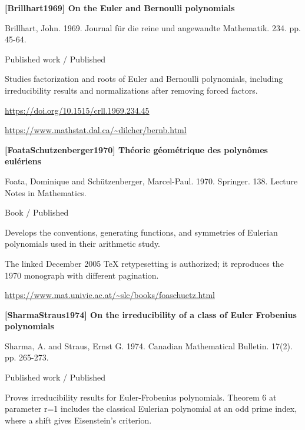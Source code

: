 \documentclass[11pt,a4paper,oneside,openany]{book}
\begin{document}
\hypertarget{ref:Brillhart1969}{}
{\sffamily\bfseries\color{atlasgreen}[Brillhart1969] On the Euler and Bernoulli polynomials}\par
\color{black} Brillhart, John. 1969. Journal für die reine und angewandte Mathematik. 234. pp. 45-64.\par
{\small\sffamily\color{atlasgold}Published work / Published}\par
\color{black} Studies factorization and roots of Euler and Bernoulli polynomials, including irreducibility results and normalizations after removing forced factors.\par
{\footnotesize\url{https://doi.org/10.1515/crll.1969.234.45}}\par
{\footnotesize\url{https://www.mathstat.dal.ca/~dilcher/bernb.html}}\par
\vspace{9pt}
\hypertarget{ref:FoataSchutzenberger1970}{}
{\sffamily\bfseries\color{atlasgreen}[FoataSchutzenberger1970] Théorie géométrique des polynômes eulériens}\par
\color{black} Foata, Dominique and Schützenberger, Marcel-Paul. 1970. Springer. 138. Lecture Notes in Mathematics.\par
{\small\sffamily\color{atlasgold}Book / Published}\par
\color{black} Develops the conventions, generating functions, and symmetries of Eulerian polynomials used in their arithmetic study.\par
{\small The linked December 2005 TeX retypesetting is authorized; it reproduces the 1970 monograph with different pagination.}\par
{\footnotesize\url{https://www.mat.univie.ac.at/~slc/books/foaschuetz.html}}\par
\vspace{9pt}
\hypertarget{ref:SharmaStraus1974}{}
{\sffamily\bfseries\color{atlasgreen}[SharmaStraus1974] On the irreducibility of a class of Euler Frobenius polynomials}\par
\color{black} Sharma, A. and Straus, Ernst G. 1974. Canadian Mathematical Bulletin. 17(2). pp. 265-273.\par
{\small\sffamily\color{atlasgold}Published work / Published}\par
\color{black} Proves irreducibility results for Euler-Frobenius polynomials. Theorem 6 at parameter r=1 includes the classical Eulerian polynomial at an odd prime index, where a shift gives Eisenstein's criterion.\par
\end{document}
